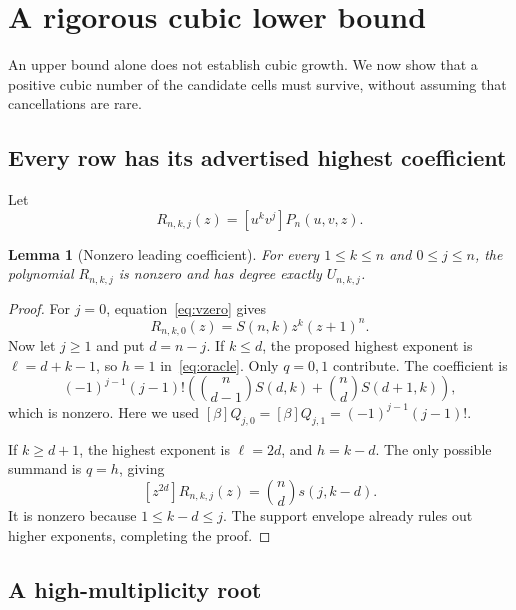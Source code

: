\documentclass[11pt]{article}
\numberwithin{equation}{section}
\newtheorem{lemma}[theorem]{Lemma}
\theoremstyle{definition}
\theoremstyle{remark}
\begin{document}
\section{A rigorous cubic lower bound}

An upper bound alone does not establish cubic growth. We now show that a
positive cubic number of the candidate cells must survive, without
assuming that cancellations are rare.

\subsection{Every row has its advertised highest coefficient}

Let
\[
 R_{n,k,j}(z)=[u^kv^j]P_n(u,v,z).
\]

\begin{lemma}[Nonzero leading coefficient]\label{lem:leading}
For every $1\le k\le n$ and $0\le j\le n$, the polynomial $R_{n,k,j}$ is
nonzero and has degree exactly $U_{n,k,j}$.
\end{lemma}
\begin{proof}
For $j=0$, equation~\eqref{eq:vzero} gives
\[
 R_{n,k,0}(z)=S(n,k)z^k(z+1)^n.
\]
Now let $j\ge1$ and put $d=n-j$. If $k\le d$, the proposed highest exponent
is $\ell=d+k-1$, so $h=1$ in~\eqref{eq:oracle}. Only $q=0,1$ contribute.
The coefficient is
\begin{equation}\label{eq:leadlowk}
 (-1)^{j-1}(j-1)!\left(
 \binom n{d-1}S(d,k)+\binom nd S(d+1,k)\right),
\end{equation}
which is nonzero. Here we used
$[\beta]Q_{j,0}=[\beta]Q_{j,1}=(-1)^{j-1}(j-1)!$.

If $k\ge d+1$, the highest exponent is $\ell=2d$, and $h=k-d$.
The only possible summand is $q=h$, giving
\begin{equation}\label{eq:leadhighk}
 [z^{2d}]R_{n,k,j}(z)=\binom nd s(j,k-d).
\end{equation}
It is nonzero because $1\le k-d\le j$. The support envelope already rules
out higher exponents, completing the proof.
\end{proof}

\subsection{A high-multiplicity root}
\end{document}
